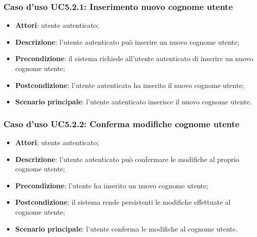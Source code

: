 \subsubsection{Caso d'uso UC5.2.1: Inserimento nuovo cognome utente}

\begin{itemize}
	\item \textbf{Attori}: utente autenticato;
	\item \textbf{Descrizione}: l'utente autenticato può inserire un nuovo cognome utente;
	\item \textbf{Precondizione}:  il sistema richiede all'utente autenticato di inserire un nuovo cognome utente;
	\item \textbf{Postcondizione}:  l'utente autenticato ha inserito il nuovo cognome utente;
	\item \textbf{Scenario principale}: l'utente autenticato inserisce il nuovo cognome utente.
\end{itemize}

\subsubsection{Caso d'uso UC5.2.2: Conferma modifiche cognome utente}

\begin{itemize}
	\item \textbf{Attori}: utente autenticato;
	\item \textbf{Descrizione}: l'utente autenticato può confermare le modifiche al proprio cognome utente;
	\item \textbf{Precondizione}: l'utente ha inserito un nuovo cognome utente;
	\item \textbf{Postcondizione}: il sistema rende persistenti le modifiche effettuate al cognome utente;
	\item \textbf{Scenario principale}: l'utente conferma le modifiche al cognome utente.
\end{itemize}

